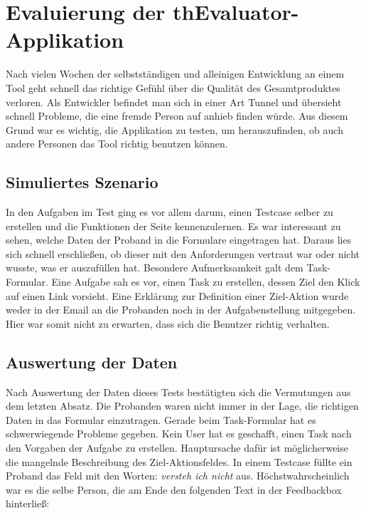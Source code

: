 %
%
%
%

\section{Evaluierung der thEvaluator-Applikation}

Nach vielen Wochen der selbstständigen und alleinigen Entwicklung an einem Tool geht schnell das richtige Gefühl über die Qualität des Gesamtproduktes verloren. Als Entwickler befindet man sich in einer Art Tunnel und übersieht schnell Probleme, die eine fremde Person auf anhieb finden würde. Aus diesem Grund war es wichtig, die Applikation zu testen, um herauszufinden, ob auch andere Personen das Tool richtig benutzen können.

\subsection{Simuliertes Szenario}

In den Aufgaben im Test ging es vor allem darum, einen Testcase selber zu erstellen und die Funktionen der Seite kennenzulernen. Es war interessant zu sehen, welche Daten der Proband in die Formulare eingetragen hat. Daraus lies sich schnell erschließen, ob dieser mit den Anforderungen vertraut war oder nicht wusste, was er auszufüllen hat. Besondere Aufmerksamkeit galt dem Task-Formular. Eine Aufgabe sah es vor, einen Task zu erstellen, dessen Ziel den Klick auf einen Link vorsieht. Eine Erklärung zur Definition einer Ziel-Aktion wurde weder in der Email an die Probanden noch in der Aufgabenstellung mitgegeben. Hier war somit nicht zu erwarten, dass sich die Benutzer richtig verhalten.

\subsection{Auswertung der Daten}

Nach Auswertung der Daten dieses Tests bestätigten sich die Vermutungen aus dem letzten Absatz. Die Probanden waren nicht immer in der Lage, die richtigen Daten in das Formular einzutragen. Gerade beim Task-Formular hat es schwerwiegende Probleme gegeben. Kein User hat es geschafft, einen Task nach den Vorgaben der Aufgabe zu erstellen. Hauptursache dafür ist möglicherweise die mangelnde Beschreibung des Ziel-Aktionsfeldes. In einem Testcase füllte ein Proband das Feld mit den Worten: \glqq \textit{versteh ich nicht}\grqq{} aus. Höchstwahrscheinlich war es die selbe Person, die am Ende den folgenden Text in der Feedbackbox hinterließ:

